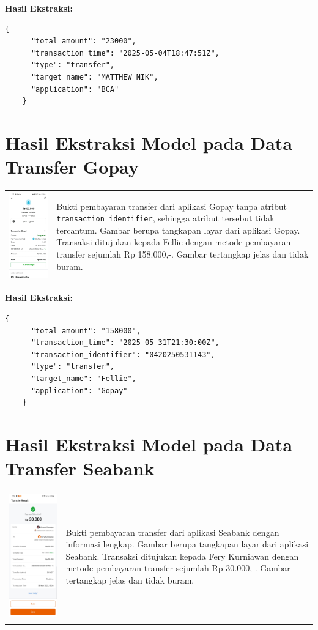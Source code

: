 \textbf{Hasil Ekstraksi:}
\begin{lstlisting}[style=jsonstyle]
    {
      "total_amount": "23000",
      "transaction_time": "2025-05-04T18:47:51Z",
      "type": "transfer",
      "target_name": "MATTHEW NIK",
      "application": "BCA"
    }
\end{lstlisting}

\clearpage

\section{Hasil Ekstraksi Model pada Data Transfer Gopay}

\begin{table}[h!]
    \centering
    \begin{tabularx}{\textwidth}{m{} X}
        \includegraphics[width=\linewidth]{images/contoh-data/tf-2.jpg}
        & 
        Bukti pembayaran transfer dari aplikasi Gopay tanpa atribut \texttt{transaction\_identifier}, sehingga atribut tersebut tidak tercantum. Gambar berupa tangkapan layar dari aplikasi Gopay. Transaksi ditujukan kepada Fellie dengan metode pembayaran transfer sejumlah Rp 158.000,-. Gambar tertangkap jelas dan tidak buram. \\
    \end{tabularx}
\end{table}

\textbf{Hasil Ekstraksi:}
\begin{lstlisting}[style=jsonstyle]
    {
      "total_amount": "158000",
      "transaction_time": "2025-05-31T21:30:00Z",
      "transaction_identifier": "0420250531143",
      "type": "transfer",
      "target_name": "Fellie",
      "application": "Gopay"
    }
\end{lstlisting}

\clearpage

\section{Hasil Ekstraksi Model pada Data Transfer Seabank}

\begin{table}[h!]
    \centering
    \begin{tabularx}{\textwidth}{m{} X}
        \includegraphics[width=\linewidth]{images/contoh-data/tf-3.jpg}
        & 
        Bukti pembayaran transfer dari aplikasi Seabank dengan informasi lengkap. Gambar berupa tangkapan layar dari aplikasi Seabank. Transaksi ditujukan kepada Fery Kurniawan dengan metode pembayaran transfer sejumlah Rp 30.000,-. Gambar tertangkap jelas dan tidak buram. \\
    \end{
\end{tabularx}
\end{table}
